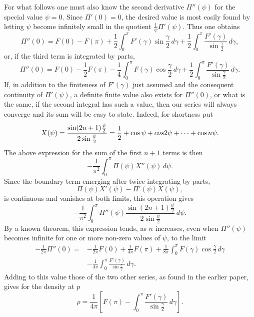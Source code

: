 \documentclass[11pt]{article}
\newcommand{\dd}{\,d}
\begin{document}
For what follows one must also know the second derivative $\Pi''(\psi)$ for the special value $\psi=0$. Since $\Pi'(0)=0$, the desired value is most easily found by letting $\psi$ become infinitely small in the quotient $\frac1\psi\Pi'(\psi)$. Thus one obtains
\[
 \Pi''(0)=F(0)-F(\pi)+\frac12\int_0^\pi F'(\gamma)\sin\frac{\gamma}{2}\dd\gamma
 +\frac12\int_0^\pi\frac{F'(\gamma)}{\sin\frac{\gamma}{2}}\dd\gamma,
\]
or, if the third term is integrated by parts,
\[
 \Pi''(0)=F(0)-\frac12 F(\pi)-\frac14\int_0^\pi F(\gamma)\cos\frac{\gamma}{2}\dd\gamma
 +\frac12\int_0^\pi\frac{F'(\gamma)}{\sin\frac{\gamma}{2}}\dd\gamma.
\]
If, in addition to the finiteness of $F'(\gamma)$ just assumed and the consequent continuity of $\Pi'(\psi)$, a definite finite value also exists for $\Pi''(0)$, or what is the same, if the second integral has such a value, then our series will always converge and its sum will be easy to state. Indeed, for shortness put
\[
 X(\psi)=\frac{\sin(2n+1)\frac{\psi}{2}}{2\sin\frac{\psi}{2}}=\frac12+\cos\psi+\\cos2\psi+\cdots+\cos n\psi.
\]
The above expression for the sum of the first $n+1$ terms is then
\[
 -\frac1{\pi^2}\int_0^\pi\Pi(\psi)X''(\psi)\dd\psi.
\]
Since the boundary term emerging after twice integrating by parts,
\[
 \Pi(\psi)X'(\psi)-\Pi'(\psi)X(\psi),
\]
is continuous and vanishes at both limits, this operation gives
\[
 -\frac1{\pi^2}\int_0^\pi\Pi''(\psi)\frac{\sin(2n+1)\frac{\psi}{2}}{2\sin\frac{\psi}{2}}\dd\psi.
\]
By a known theorem, this expression tends, as $n$ increases, even when $\Pi''(\psi)$ becomes infinite for one or more non-zero values of $\psi$, to the limit
\begin{align*}
 -\frac1{2\pi}\Pi''(0)=&-\frac1{2\pi}F(0)+\frac1{4\pi}F(\pi)
 +\frac1{8\pi}\int_0^\pi F(\gamma)\cos\frac{\gamma}{2}\dd\gamma \\
&-\frac1{4\pi}\int_0^\pi\frac{F'(\gamma)}{\sin\frac{\gamma}{2}}\dd\gamma.
\end{align*}
Adding to this value those of the two other series, as found in the earlier paper, gives for the density at $p$
\[
 \rho=\frac1{4\pi}\left[F(\pi)-\int_0^\pi\frac{F'(\gamma)}{\sin\frac{\gamma}{2}}\dd\gamma\right].
\]
\end{document}
